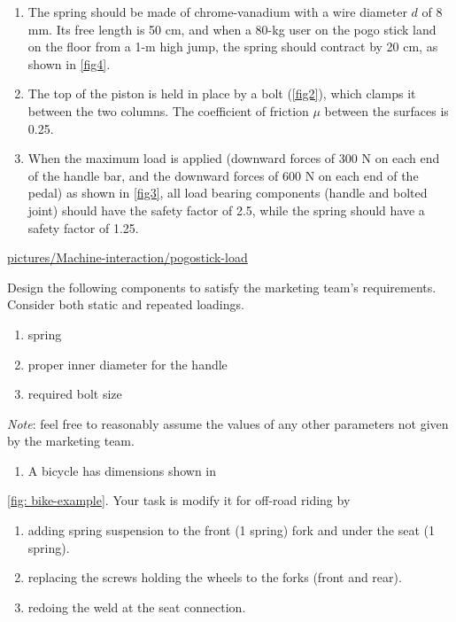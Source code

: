\documentclass[a4paper,openany,nobib]{tufte-book}
\begin{document}
{{\begin{enumerate}
\item The spring should be made of chrome-vanadium with a wire diameter \(d\)
of 8 mm. Its free length is 50 cm, and when a 80-kg user on the pogo
stick land on the floor from a 1-m high jump, the spring should
contract by 20 cm, as shown in \ref{fig4}.

\item The top of the piston is held in place by a bolt (\ref{fig2}),
which clamps it between the two columns. The coefficient of friction
\(\mu\) between the surfaces is 0.25.

\item When the maximum load is applied (downward forces of 300 N on each
end of the handle bar, and the downward forces of 600 N on each end
of the pedal) as shown in \ref{fig3}, all load bearing
components (handle and bolted joint) should have the safety factor of
2.5, while the spring should have a safety factor of 1.25.
\end{enumerate}


\url{pictures/Machine-interaction/pogostick-load}

Design the following components to satisfy the marketing team's
requirements. Consider both static and repeated loadings.

\begin{enumerate}
\item spring

\item proper inner diameter for the handle

\item required bolt size
\end{enumerate}

\emph{Note}: feel free to reasonably assume the values of any other
parameters not given by the marketing team.

\begin{enumerate}
\item A bicycle has dimensions shown in
\end{enumerate}
\ref{fig: bike-example}. Your task is modify it for
off-road riding by

\begin{enumerate}
\item adding spring suspension to the front (1 spring) fork and under the
seat (1 spring).

\item replacing the screws holding the wheels to the forks (front and
rear).

\item redoing the weld at the seat connection.
\end{enumerate}

}}
\end{document}
